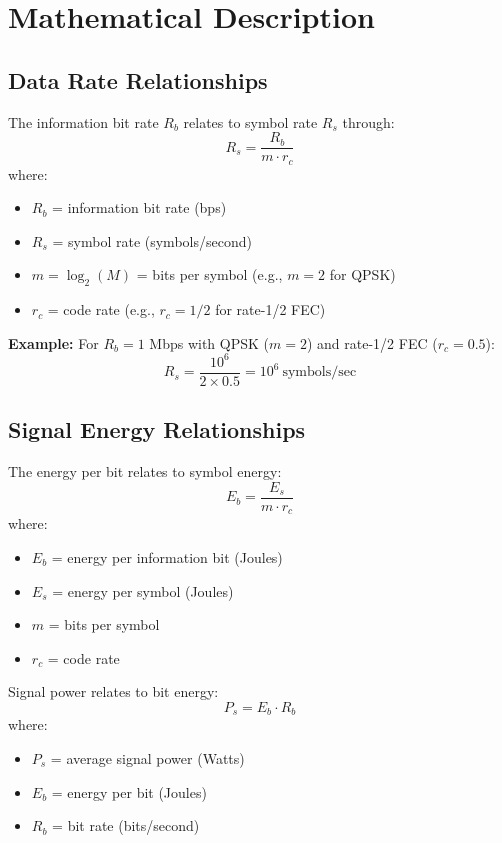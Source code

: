 \section{Mathematical Description}

\subsection{Data Rate Relationships}

The information bit rate $R_b$ relates to symbol rate $R_s$ through:
\begin{equation}
R_s = \frac{R_b}{m \cdot r_c}
\end{equation}
where:
\begin{itemize}
\item $R_b$ = information bit rate (bps)
\item $R_s$ = symbol rate (symbols/second)
\item $m = \log_2(M)$ = bits per symbol (e.g., $m=2$ for QPSK)
\item $r_c$ = code rate (e.g., $r_c = 1/2$ for rate-1/2 FEC)
\end{itemize}

\textbf{Example:} For $R_b = 1$ Mbps with QPSK ($m=2$) and rate-1/2 FEC ($r_c = 0.5$):
\begin{equation}
R_s = \frac{10^6}{2 \times 0.5} = 10^6\ \text{symbols/sec}
\end{equation}

\subsection{Signal Energy Relationships}

The energy per bit relates to symbol energy:
\begin{equation}
E_b = \frac{E_s}{m \cdot r_c}
\end{equation}
where:
\begin{itemize}
\item $E_b$ = energy per information bit (Joules)
\item $E_s$ = energy per symbol (Joules)
\item $m$ = bits per symbol
\item $r_c$ = code rate
\end{itemize}

Signal power relates to bit energy:
\begin{equation}
P_s = E_b \cdot R_b
\end{equation}
where:
\begin{itemize}
\item $P_s$ = average signal power (Watts)
\item $E_b$ = energy per bit (Joules)
\item $R_b$ = bit rate (bits/second)
\end{itemize}

